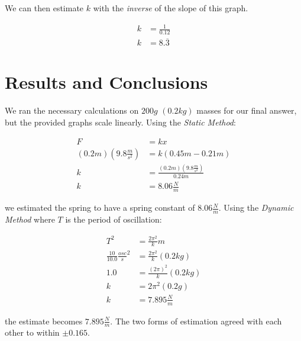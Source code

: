 \documentclass{article}
\begin{document}
We can then estimate $k$ with the \emph{inverse} of the slope of this graph.

\begin{center}
\begin{align*}
k &= \frac{1}{0.12} \\
k &= 8.\overline{3}
\end{align*}
\end{center}

\pagebreak

\section{Results and Conclusions}

We ran the necessary calculations on $200g$ $(0.2kg)$ masses for our final answer, but the provided graphs scale linearly. Using the \emph{Static Method}:

\begin{align*}
F &= kx \\
(0.2m)(9.8\frac{m}{s^2}) &= k(0.45m-0.21m) \\
k &= \frac{(0.2m)(9.8\frac{m}{s^2})}{0.24m} \\
k &= 8.06\frac{N}{m}
\end{align*}

we estimated the spring to have a spring constant of $8.06\frac{N}{m}$.
Using the \emph{Dynamic Method} where $T$ is the period of oscillation:

\begin{align*}
T^{2} &= \frac{2\pi^{2}}{k}m \\
\frac{10}{10.0}\frac{osc}{s}^2 &= \frac{2\pi^{2}}{k}(0.2kg) \\
1.0 &= \frac{(2\pi)^{2}}{k}(0.2kg) \\
k &= 2\pi^2(0.2g) \\
k &= 7.895\frac{N}{m}
\end{align*}

the estimate becomes $7.895\frac{N}{m}$. The two forms of estimation agreed with each other to within $\pm{0.165}$.
\end{document}
